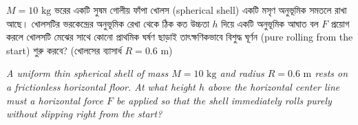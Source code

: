 \documentclass[12pt, a4paper]{article}
\begin{document}
\begin{tcolorbox}[questionbox={প্রশ্ন (Question) 39}]
\noindent
$M = 10\text{ kg}$ ভরের একটি সুষম গোলীয় ফাঁপা খোলস (spherical shell) একটি মসৃণ অনুভূমিক সমতলে রাখা আছে। খোলসটির ভরকেন্দ্রের অনুভূমিক রেখা থেকে ঠিক কত উচ্চতা $h$ দিয়ে একটি অনুভূমিক আঘাত বল $F$ প্রয়োগ করলে খোলসটি মেঝের সাথে কোনো প্রাথমিক ঘর্ষণ ছাড়াই তাৎক্ষণিকভাবে বিশুদ্ধ ঘূর্ণন (pure rolling from the start) শুরু করবে? (খোলসের ব্যাসার্ধ $R = 0.6\text{ m}$)

\vspace{0.8em}
\begin{english}
\noindent\textit{\color{darkgray}
A uniform thin spherical shell of mass $M = 10\text{ kg}$ and radius $R = 0.6\text{ m}$ rests on a frictionless horizontal floor. At what height $h$ above the horizontal center line must a horizontal force $F$ be applied so that the shell immediately rolls purely without slipping right from the start?
}
\end{english}
\end{tcolorbox}
\end{document}
